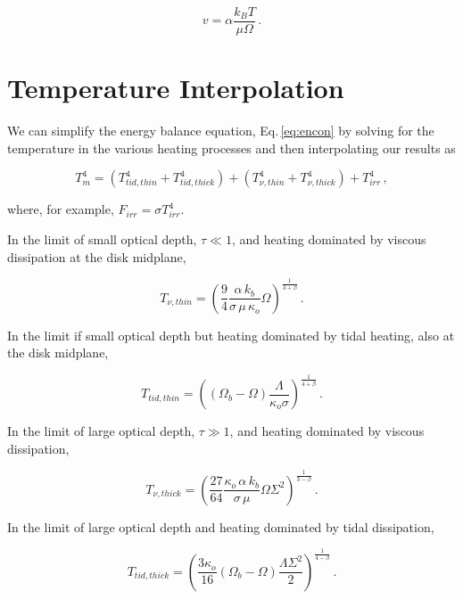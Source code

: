 \documentclass{article}
\begin{document}
\begin{equation}
v = 	\alpha \frac{k_B T}{\mu \Omega}\,.
\end{equation}

\section{Temperature Interpolation}

We can simplify the energy balance equation, Eq.\,\ref{eq:encon} by solving for the temperature in the various heating processes and then interpolating our results as 

\begin{equation}
T_m^4 = \left(T_{tid, thin}^ 4 + T_{tid, thick}^4\right) + \left(T_{\nu, thin}^4 + T_{\nu, thick}^4\right) + T_{irr}^4\,,
\end{equation}

where, for example, $F_{irr} = \sigma T_{irr}^4$. 

In the limit of small optical depth, $\tau \ll 1$, and heating dominated by viscous dissipation at the disk midplane, 

\begin{equation}
T_{\nu, thin} = \left(\frac{9}{4} \frac{\alpha\,k_b}{\sigma\,\mu\,\kappa_o} \Omega\right)^\frac{1}{3+\beta}\,.
\end{equation}

In the limit if small optical depth but heating dominated by tidal heating, also at the disk midplane,

\begin{equation}
T_{tid,thin} = \left((\Omega_b - \Omega)\frac{\Lambda}{\kappa_o \sigma} \right)^\frac{1}{4+\beta}\,.
\end{equation}

In the limit of large optical depth, $\tau \gg 1$, and heating dominated by viscous dissipation,

\begin{equation}
T_{\nu, thick} = \left(\frac{27}{64} \frac{\kappa_o\,\alpha\,k_b}{\sigma\,\mu} \Omega \Sigma^2\right)^\frac{1}{3-\beta}\,.
\end{equation}

In the limit of large optical depth and heating dominated by tidal dissipation,

\begin{equation}
T_{tid, thick} = \left(\frac{ 3 \kappa_o}{16}(\Omega_b - \Omega)\frac{\Lambda \Sigma^2}{2}\right)^\frac{1}{4-\beta}\,.
\end{equation}
\end{document}
